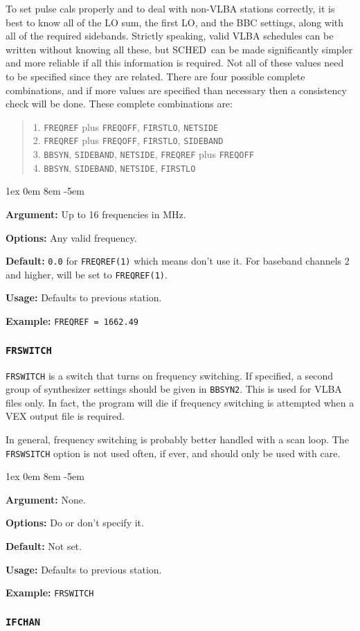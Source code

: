 \documentclass{report}
\newcommand{\schedb}{{\sc SCHED~}}
\newcommand{\rcwbox}[5]{
  \begin{list}{}{\parsep 1ex  \itemsep 0em
                 \leftmargin 8em  \itemindent -5em }
    \item {\bf Argument:} #1
    \item {\bf Options:}  #2
    \item {\bf Default:}  #3
    \item {\bf Usage:}    #4
    \item {\bf Example:}  #5
  \end{list}
}
\begin{document}
To set pulse cals properly and to deal with non-VLBA stations
correctly, it is best to know all of the LO sum, the first LO, and the
BBC settings, along with all of the required sidebands. Strictly
speaking, valid VLBA schedules can be written without knowing all
these, but \schedb can be made significantly simpler and more
reliable if all this information is required. Not all of these values
need to be specified since they are related. There are four possible
complete combinations, and if more values are specified than necessary
then a consistency check will be done. These complete combinations
are:
\begin{verse}
1. {\tt FREQREF} plus {\tt FREQOFF}, {\tt FIRSTLO}, {\tt NETSIDE}  \\
2. {\tt FREQREF} plus {\tt FREQOFF}, {\tt FIRSTLO}, {\tt SIDEBAND} \\
3. {\tt BBSYN}, {\tt SIDEBAND}, {\tt NETSIDE},
   {\tt FREQREF} plus {\tt FREQOFF} \\
4. {\tt BBSYN}, {\tt SIDEBAND}, {\tt NETSIDE}, {\tt FIRSTLO} \\
\end{verse}

\rcwbox
{Up to 16 frequencies in MHz.}
{Any valid frequency.}
{{\tt 0.0} for {\tt FREQREF(1)} which means don't use it. For baseband
channels 2 and higher, will be set to {\tt FREQREF(1)}.}
{Defaults to previous station.}
{{\tt FREQREF = 1662.49}}


\subsubsection{\label{SP:FRSWITCH}{\tt FRSWITCH}}

{\tt FRSWITCH} is a switch that turns on frequency switching. If
specified, a second group of synthesizer settings should be given in
{\tt BBSYN2}. This is used for VLBA files only.  In fact, the program
will die if frequency switching is attempted when a VEX output
file is required.

In general, frequency switching is probably better handled with a
scan loop.  The {\tt FRSWSITCH} option is not used often, if ever, and
should only be used with care.

\rcwbox
{None.}
{Do or don't specify it.}
{Not set.}
{Defaults to previous station.}
{{\tt FRSWITCH}}


\subsubsection{\label{SP:IFCHAN}{\tt IFCHAN}}
\end{document}
